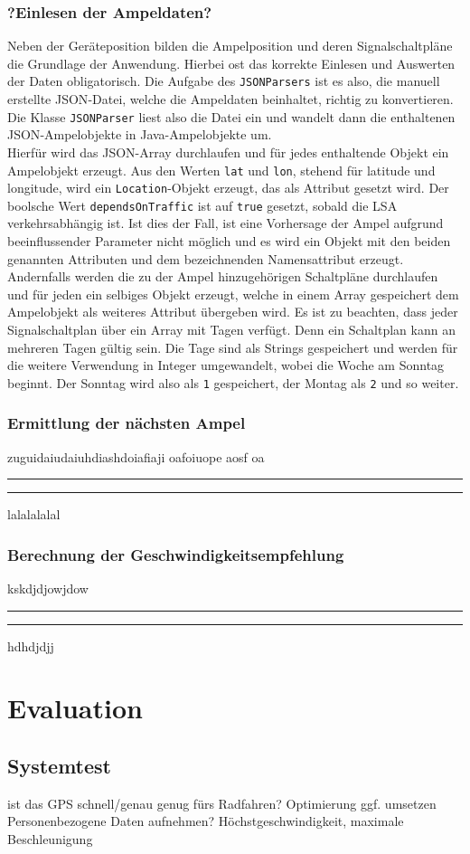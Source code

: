 \subsection{?Einlesen der Ampeldaten?}
Neben der Geräteposition bilden die Ampelposition und deren Signalschaltpläne die Grundlage der Anwendung. Hierbei ost das korrekte Einlesen und Auswerten der Daten obligatorisch. Die Aufgabe des \texttt{JSONParsers} ist es also, die manuell erstellte \gls{JSON}-Datei, welche die Ampeldaten beinhaltet, richtig zu konvertieren.  Die Klasse \texttt{JSONParser} liest also die Datei ein und wandelt dann die enthaltenen \gls{JSON}-Ampelobjekte in Java-Ampelobjekte um.\\ 
Hierfür wird das \gls{JSON}-Array durchlaufen und für jedes enthaltende Objekt ein Ampelobjekt erzeugt. Aus den Werten \texttt{lat} und \texttt{lon}, stehend für latitude und longitude, wird ein \texttt{Location}-Objekt erzeugt, das als Attribut gesetzt wird. Der boolsche Wert \texttt{dependsOnTraffic} ist auf \texttt{true} gesetzt, sobald die \gls{LSA} verkehrsabhängig ist. Ist dies der Fall, ist eine Vorhersage der Ampel aufgrund beeinflussender Parameter nicht möglich und es wird ein Objekt mit den beiden genannten Attributen und dem bezeichnenden Namensattribut erzeugt. Andernfalls werden die zu der Ampel hinzugehörigen Schaltpläne durchlaufen und für jeden ein selbiges Objekt erzeugt, welche in einem Array gespeichert dem Ampelobjekt als weiteres Attribut übergeben wird. Es ist zu beachten, dass jeder Signalschaltplan über ein Array mit Tagen verfügt. Denn ein Schaltplan kann an mehreren Tagen gültig sein. Die Tage sind als Strings gespeichert und werden für die weitere Verwendung in Integer umgewandelt, wobei die Woche am Sonntag beginnt. Der Sonntag wird also als \texttt{1} gespeichert, der Montag als \texttt{2} und so weiter. 
\subsection{Ermittlung der nächsten Ampel}
zuguidaiudaiuhdiashdoiafiaji oafoiuope aosf oa \\
\begin{center}
\rule{35em}{0.5pt}

\rule{35em}{0.5pt}
\end{center}
lalalalalal
 
\subsection{Berechnung der Geschwindigkeitsempfehlung}
kskdjdjowjdow
\begin{center}
\rule{35em}{0.5pt}  \rule{35em}{0.5pt}
\end{center}
hdhdjdjj

%
%
\chapter{Evaluation}
\section{Systemtest}
ist das GPS schnell/genau genug fürs Radfahren?
Optimierung ggf. umsetzen\\
Personenbezogene Daten aufnehmen? Höchstgeschwindigkeit, maximale Beschleunigung
